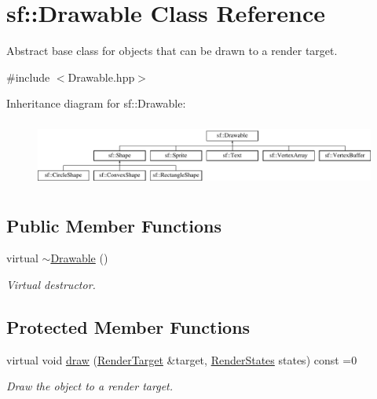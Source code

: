 \hypertarget{classsf_1_1_drawable}{}\section{sf\+:\+:Drawable Class Reference}
\label{classsf_1_1_drawable}


Abstract base class for objects that can be drawn to a render target.  




{\ttfamily \#include $<$Drawable.\+hpp$>$}

Inheritance diagram for sf\+:\+:Drawable\+:\begin{figure}[H]
\begin{center}
\leavevmode
\includegraphics[height=2.187500cm]{classsf_1_1_drawable}
\end{center}
\end{figure}
\subsection*{Public Member Functions}
\begin{DoxyCompactItemize}
\item 
virtual \mbox{\hyperlink{classsf_1_1_drawable_a906002f2df7beb5edbddf5bbef96f120}{$\sim$\+Drawable}} ()
\begin{DoxyCompactList}\small\item\em Virtual destructor. \end{DoxyCompactList}\end{DoxyCompactItemize}
\subsection*{Protected Member Functions}
\begin{DoxyCompactItemize}
\item 
virtual void \mbox{\hyperlink{classsf_1_1_drawable_a90d2c88bba9b035a0844eccb380ef631}{draw}} (\mbox{\hyperlink{classsf_1_1_render_target}{Render\+Target}} \&target, \mbox{\hyperlink{classsf_1_1_render_states}{Render\+States}} states) const =0
\begin{DoxyCompactList}\small\item\em Draw the object to a render target. \end{DoxyCompactList}\end{DoxyCompactItemize}

